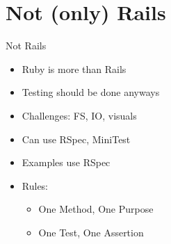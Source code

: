 \documentclass[style=paintings,display=slides,clock]{powerdot}
\begin{document}
\section{Not (only) Rails}
\begin{note}{Not Rails}
	\begin{itemize}
		\item Ruby is more than Rails
		\item Testing should be done anyways
		\item Challenges: FS, IO, visuals
		\item Can use RSpec, MiniTest
		\item Examples use RSpec
		\item Rules:
			\begin{itemize}
				\item One Method, One Purpose
				\item One Test, One Assertion
			\end{itemize}
	\end{itemize}
\end{note}
\end{document}
